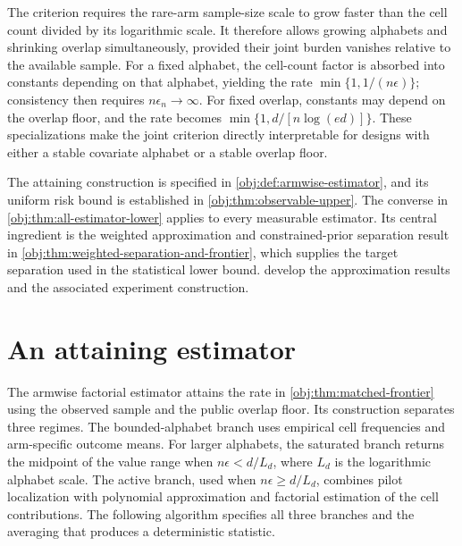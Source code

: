 \documentclass[11pt]{article}
\begin{document}
The criterion requires the rare-arm sample-size scale to grow faster than the cell count divided by its logarithmic scale. It therefore allows growing alphabets and shrinking overlap simultaneously, provided their joint burden vanishes relative to the available sample. For a fixed alphabet, the cell-count factor is absorbed into constants depending on that alphabet, yielding the rate \(\min\{1,1/(n\epsilon)\}\); consistency then requires \(n\epsilon_n\to\infty\). For fixed overlap, constants may depend on the overlap floor, and the rate becomes \(\min\{1,d/[n\log(ed)]\}\). These specializations make the joint criterion directly interpretable for designs with either a stable covariate alphabet or a stable overlap floor.

The attaining construction is specified in \cref{obj:def:armwise-estimator}, and its uniform risk bound is established in \cref{obj:thm:observable-upper}. The converse in \cref{obj:thm:all-estimator-lower} applies to every measurable estimator. Its central ingredient is the weighted approximation and constrained-prior separation result in \cref{obj:thm:weighted-separation-and-frontier}, which supplies the target separation used in the statistical lower bound.  develop the approximation results and the associated experiment construction.


\section{An attaining estimator}

The armwise factorial estimator  attains the rate in \cref{obj:thm:matched-frontier} using the observed sample and the public overlap floor. Its construction separates three regimes. The bounded-alphabet branch uses empirical cell frequencies and arm-specific outcome means. For larger alphabets, the saturated branch returns the midpoint of the value range when \(n\epsilon<d/L_d\), where \(L_d\) is the logarithmic alphabet scale. The active branch, used when \(n\epsilon\ge d/L_d\), combines pilot localization with polynomial approximation and factorial estimation of the cell contributions. The following algorithm specifies all three branches and the averaging that produces a deterministic statistic.
\end{document}
